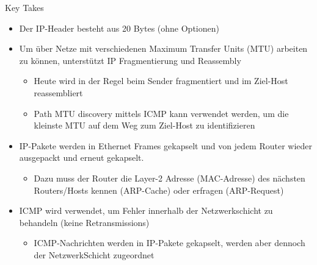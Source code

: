 \begin{KR}{Key Takes}
    \begin{itemize}
        \item Der IP-Header besteht aus 20 Bytes (ohne Optionen)
        \item Um über Netze mit verschiedenen Maximum Transfer Units (MTU) arbeiten zu können, unterstützt IP Fragmentierung und Reassembly
        \begin{itemize}
            \item Heute wird in der Regel beim Sender fragmentiert und im Ziel-Host reassembliert
            \item Path MTU discovery mittels ICMP kann verwendet werden, um die kleinste MTU auf dem Weg zum Ziel-Host zu identifizieren
        \end{itemize}
        \item IP-Pakete werden in Ethernet Frames gekapselt und von jedem Router wieder ausgepackt und erneut gekapselt.
        \begin{itemize}
            \item Dazu muss der Router die Layer-2 Adresse (MAC-Adresse) des nächsten Routers/Hosts kennen (ARP-Cache) oder erfragen (ARP-Request)
        \end{itemize}
        \item ICMP wird verwendet, um Fehler innerhalb der Netzwerkschicht zu behandeln (keine Retransmissions)
        \begin{itemize}
            \item ICMP-Nachrichten werden in IP-Pakete gekapselt, werden aber dennoch der NetzwerkSchicht zugeordnet
        \end{itemize}
    \end{itemize}
\end{KR}









